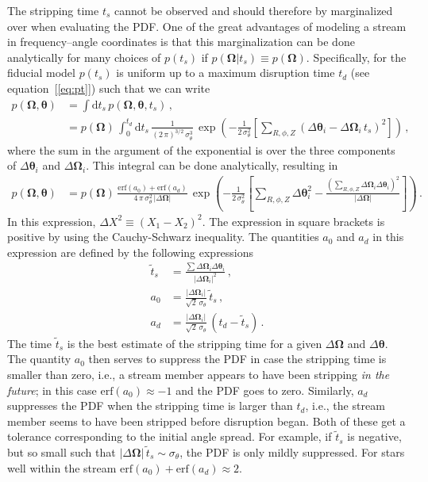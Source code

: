 \documentclass[12pt,preprint]{aastex}
\newcommand{\ie}{i.e.}
\newcommand{\dd}{\mathrm{d}}
\newcommand{\eqnname}{equation}
\newcommand{\equationname}{\eqnname}
\renewcommand{\vec}[1]{\ensuremath{\mathbf{#1}}}
\newcommand{\veco}{\ensuremath{\vec{\Omega}}}
\newcommand{\veca}{\ensuremath{\boldsymbol\theta}}
\begin{document}
The stripping time $t_s$ cannot be observed and should therefore by
marginalized over when evaluating the PDF. One of the great advantages
of modeling a stream in frequency--angle coordinates is that this
marginalization can be done analytically for many choices of $p(t_s)$
if $p(\veco|t_s) \equiv p(\veco)$. Specifically, for the fiducial
model $p(t_s)$ is uniform up to a maximum disruption time $t_d$ (see
\equationname~[\ref{eq:pt}]) such that we can write
\begin{equation}
\begin{split}
  p(\veco,\veca) & = \int \dd t_s\,p(\veco,\veca,t_s)\,,\\
  & = p(\veco)\,\int_0^{t_d} \dd t_s\,
  \frac{1}{(2\,\pi)^{3/2}\,\sigma_\theta^3}\,\exp\left(-\frac{1}{2\,\sigma_\theta^2}\left[\sum_{R,\phi,Z}\left(\Delta \veca_i-\Delta \veco_i\,t_s\right)^2\right]\right)\,,
\end{split}
\end{equation}
where the sum in the argument of the exponential is over the three
components of $\Delta \veca_i$ and $\Delta \veco_i$. This integral can
be done analytically, resulting in
\begin{equation}\label{eq:pdf}
\begin{split}
  p(\veco,\veca) & = 
  p(\veco) \,  \frac{\mathrm{erf}(a_0) + \mathrm{erf}(a_d)}{4\,\pi\,\sigma_\theta^2\,|\Delta \veco|}\,\exp\left(-\frac{1}{2\,\sigma_\theta^2}\left[\sum_{R,\phi,Z}\Delta \veca^2_i-\frac{\left(\sum_{R,\phi,Z} \Delta \veco_i\Delta \veca_i\right)^2}{|\Delta \veco|}\right]\right)\,.
\end{split}
\end{equation}
In this expression, $\Delta X^2 \equiv (X_1-X_2)^2$. The expression in
square brackets is positive by using the Cauchy-Schwarz
inequality. The quantities $a_0$ and $a_d$ in this expression are
defined by the following expressions
\begin{align}
  \tilde{t}_s & = \frac{\sum \Delta \veco_i\Delta \veca_i}{|\Delta \veco_i|^2}\,,\\
  a_0 & = \frac{|\Delta \veco_i|}{\sqrt{2}\,\sigma_\theta}\,\tilde{t}_s\,,\\
  a_d & = \frac{|\Delta \veco_i|}{\sqrt{2}\,\sigma_\theta}\,\left(t_d - \tilde{t}_s\right)\,.
\end{align}
The time $\tilde{t}_s$ is the best estimate of the stripping time for
a given $\Delta \veco$ and $\Delta \veca$. The quantity $a_0$ then
serves to suppress the PDF in case the stripping time is smaller than
zero, \ie, a stream member appears to have been stripping \emph{in the
  future}; in this case $\mathrm{erf}(a_0) \approx -1$ and the PDF
goes to zero. Similarly, $a_d$ suppresses the PDF when the stripping
time is larger than $t_d$, \ie, the stream member seems to have been
stripped before disruption began. Both of these get a tolerance
corresponding to the initial angle spread. For example, if
$\tilde{t}_s$ is negative, but so small such that $|\Delta
\veco|\,\tilde{t}_s \sim \sigma_\theta$, the PDF is only mildly
suppressed. For stars well within the stream $\mathrm{erf}(a_0) +
\mathrm{erf}(a_d) \approx 2$.
\end{document}
